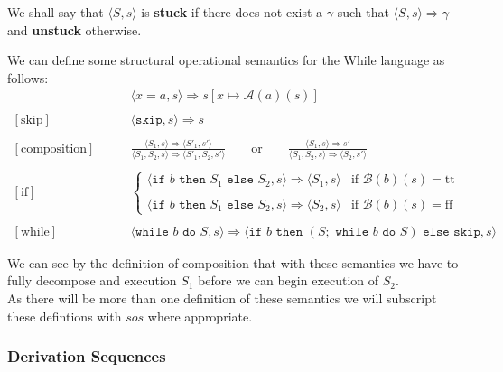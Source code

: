 \documentclass[a4paper, 12pt, twoside]{article}
\begin{document}
\noindent
We shall say that $\langle S, s \rangle$ is \textbf{stuck} if there
does not exist a $\gamma$ such that $\langle S, s \rangle
\Rightarrow \gamma$ and \textbf{unstuck} otherwise. 

\newpage

We can define some structural operational semantics for the While 
language as follows:
\begin{align*}
  [\text{assignment}]& \qquad \langle x=a, s \rangle \Rightarrow s[x\mapsto \mathcal{A}(a)(s)] \\ \\
  [\text{skip}]& \qquad \langle \texttt{skip}, s \rangle \Rightarrow s \\ \\
  [\text{composition}]& \qquad \frac{
    \langle S_1, s \rangle \Rightarrow \langle S'_1, s' \rangle
  }{\langle S_1;S_2, s \rangle \Rightarrow \langle S'_1;S_2, s' \rangle} 
  \qquad \text{or} \qquad \frac{
    \langle S_1, s \rangle \Rightarrow s'
  }{\langle S_1;S_2, s \rangle \Rightarrow \langle S_2, s' \rangle} \\ \\
  [\text{if}]& \qquad \begin{cases}
    \langle \texttt{if } b \texttt{ then } S_1 \texttt{ else } S_2, s \rangle \Rightarrow 
    \langle S_1, s \rangle
    & \text{if } \mathcal{B}(b)(s) = \text{tt} \\ \\
    \langle \texttt{if } b \texttt{ then } S_1 \texttt{ else } S_2, s \rangle \Rightarrow
    \langle S_2, s \rangle
    & \text{if } \mathcal{B}(b)(s) = \text{ff}
  \end{cases} \\ \\
  [\text{while}]& \qquad \langle \texttt{while } b \texttt{ do } S, s \rangle \Rightarrow
    \langle \texttt{if } b \texttt{ then } (S; \texttt{ while } b \texttt{ do } S)
    \texttt{ else skip}, s \rangle
\end{align*}

We can see by the definition of composition that with these 
semantics we have to fully decompose and execution $S_1$ before
we can begin execution of $S_2$.
\\[\baselineskip]
As there will be more than one definition of these semantics
we will subscript these defintions with $sos$ where appropriate.

\subsubsection{Derivation Sequences}
\end{document}
